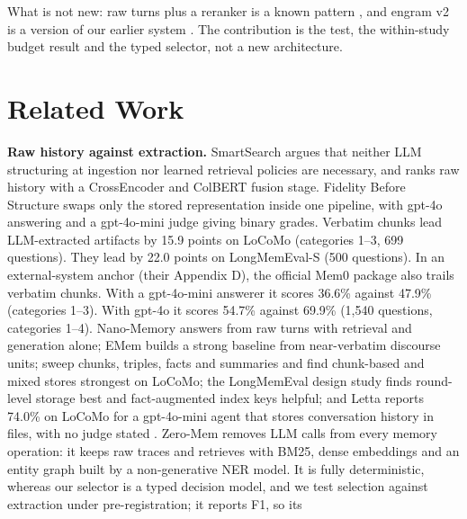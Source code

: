 \documentclass[11pt]{article}
\newcommand{\src}[1]{}
\begin{document}
\begin{enumerate}
\end{enumerate}
What is not new: raw turns plus a reranker is a known pattern \citep{derehag2026smartsearch,nanomemory2026}, and engram v2 is a version of our earlier system \citep{sharma2026typed}. The contribution is the test, the within-study budget result and the typed selector, not a new architecture.

\section{Related Work}\label{sec:2}
\textbf{Raw history against extraction.} SmartSearch \citep{derehag2026smartsearch} argues that neither LLM structuring at ingestion nor learned retrieval policies are necessary, and ranks raw history with a CrossEncoder and ColBERT fusion stage. Fidelity Before Structure \citep{an2026fidelity} swaps only the stored representation inside one pipeline, with gpt-4o answering and a gpt-4o-mini judge giving binary grades. Verbatim chunks lead LLM-extracted artifacts by 15.9\src{cite:an2026fidelity (checked against the paper's text; paper\_v3/bib\_verification.md)} points on LoCoMo (categories 1--3, 699\src{cite:an2026fidelity (checked against the paper's text; paper\_v3/bib\_verification.md)} questions). They lead by 22.0\src{cite:an2026fidelity (checked against the paper's text; paper\_v3/bib\_verification.md)} points on LongMemEval-S (500\src{cite:an2026fidelity (checked against the paper's text; paper\_v3/bib\_verification.md)} questions). In an external-system anchor (their Appendix D), the official Mem0 package also trails verbatim chunks. With a gpt-4o-mini answerer it scores 36.6\src{cite:an2026fidelity (checked against the paper's text; paper\_v3/bib\_verification.md)}\% against 47.9\src{cite:an2026fidelity (checked against the paper's text; paper\_v3/bib\_verification.md)}\% (categories 1--3). With gpt-4o it scores 54.7\src{cite:an2026fidelity (checked against the paper's text; paper\_v3/bib\_verification.md)}\% against 69.9\src{cite:an2026fidelity (checked against the paper's text; paper\_v3/bib\_verification.md)}\% (1,540\src{cite:an2026fidelity (checked against the paper's text; paper\_v3/bib\_verification.md)} questions, categories 1--4). Nano-Memory \citep{nanomemory2026} answers from raw turns with retrieval and generation alone; EMem \citep{zhou2025emem} builds a strong baseline from near-verbatim discourse units; \citet{zeng2024structural} sweep chunks, triples, facts and summaries and find chunk-based and mixed stores strongest on LoCoMo; the LongMemEval design study \citep{wu2025longmemeval} finds round-level storage best and fact-augmented index keys helpful; and Letta reports 74.0\src{cite:letta2025filesystem (checked against the paper's text; paper\_v3/bib\_verification.md)}\% on LoCoMo for a gpt-4o-mini agent that stores conversation history in files, with no judge stated \citep{letta2025filesystem}. Zero-Mem \citep{xiao2026zeromem} removes LLM calls from every memory operation: it keeps raw traces and retrieves with BM25, dense embeddings and an entity graph built by a non-generative NER model. It is fully deterministic, whereas our selector is a typed decision model, and we test selection against extraction under pre-registration; it reports F1, so its 
\end{document}
